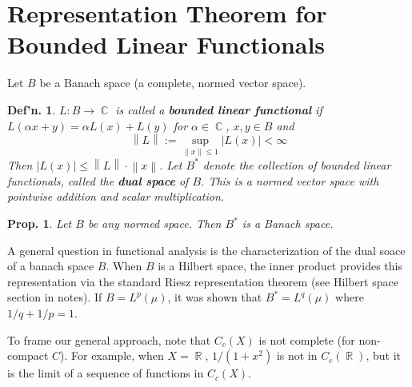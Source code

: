 \documentclass[12pt, a4paper]{book}
\DeclareMathOperator{\R}{\mathbb{R}}
\DeclareMathOperator{\C}{\mathbb{C}}
\newcommand{\norm}[1]{\left\lVert#1\right\rVert} %
\newtheorem{definition}[theorem]{Def'n.}
\newtheorem{proposition}[theorem]{Prop.}
\theoremstyle{nonumberplain}
\begin{document}
\section{Representation Theorem for Bounded Linear Functionals}
Let $B$ be a Banach space (a complete, normed vector space).
\begin{definition}
    $L:B\to\C$ is called a \textbf{bounded linear functional} if $L(\alpha x+y)=\alpha L(x)+L(y)$ for $\alpha\in\C$, $x,y\in B$ and
    \[\norm{L}:=\sup_{\norm{x}\leq 1}|L(x)|<\infty\]
    Then $|L(x)|\leq\norm{L}\cdot\norm{x}$.
    Let $B^*$ denote the collection of bounded linear functionals, called the \textbf{dual space} of $B$.
    This is a normed vector space with pointwise addition and scalar multiplication.
\end{definition}
\begin{proposition}
    Let $B$ be any normed space.
    Then $B^*$ is a Banach space.
\end{proposition}
A general question in functional analysis is the characterization of the dual soace of a banach space $B$.
When $B$ is a Hilbert space, the inner product provides this representation via the standard Riesz representation theorem (see Hilbert space section in notes).
If $B=L^p(\mu)$, it was shown that $B^*=L^q(\mu)$ where $1/q+1/p=1$.

To frame our general approach, note that $C_c(X)$ is not complete (for non-compact $C$).
For example, when $X=\R$, $1/(1+x^2)$ is not in $C_c(\R)$, but it is the limit of a sequence of functions in $C_c(X)$.
\end{document}
